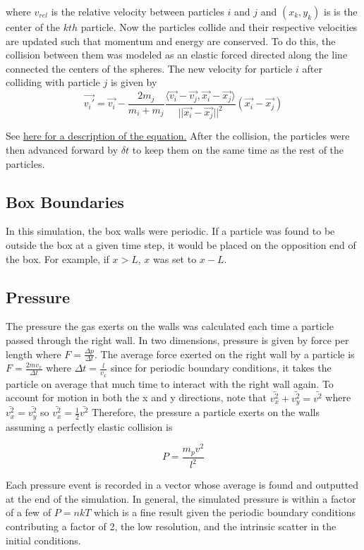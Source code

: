 \documentclass[12pt]{amsart}
\begin{document}
where $v_{rel}$ is the relative velocity between particles $i$ and $j$ and $(x_k,y_k)$ is is the center of the $kth$ particle.  Now the particles collide and their respective velocities are updated such that momentum and energy are conserved.  To do this, the collision between them was modeled as an elastic forced directed along the line connected the centers of the spheres.  The new velocity for particle $i$ after colliding with particle $j$ is given by
$$ \vec{v_i'} = \vec{v_i} - \frac{2 m_j}{m_i + m_j} \frac{\langle \vec{v_i} - \vec{v_j}, \vec{x_i} - \vec{x_j}{ \rangle}}{||\vec{x_i} - \vec{x_j}||^2} (\vec{x_i} - \vec{x_j}) $$
  
 See \href{https://en.wikipedia.org/wiki/Elastic_collision#Two-dimensional_collision_with_two_moving_objects}{here for a description of the equation.}   After the collision, the particles were then advanced forward by $\delta t$ to keep them on the same time as the rest of the particles.
 
\subsection{Box Boundaries}

In this simulation, the box walls were periodic.  If a particle was found to be outside the box at a given time step, it would be placed on the opposition end of the box.  For example, if $x > L$, $x$ was set to $x - L$.  

\subsection{Pressure}

The pressure the gas exerts on the walls was calculated each time a particle passed through the right wall.  In two dimensions, pressure is given by force per length where $F = \frac{\Delta p}{\Delta t}$.  The average force exerted on the right wall by a particle is $F = \frac{2 m v_x}{\Delta t}$ where $\Delta t = \frac{l}{v_x}$ since for periodic boundary conditions, it takes the particle on average that much time to interact with the right wall again.  To account for motion in both the x and y directions, note that $\bar{v_x^2} + \bar{v_y^2} = \bar{v^2}$ where $\bar{v_x^2} = \bar{v_y^2}$ so $\bar{v_x^2} = \frac{1}{2} \bar{v^2}$ Therefore, the pressure a particle exerts on the walls assuming a perfectly elastic collision is

$$ P =  \frac{m_p v^2}{l^2}   $$

Each pressure event is recorded in a vector whose average is found and outputted at the end of the simulation.  In general, the simulated pressure is within a factor of a few of $P = nkT$ which is a fine result given the periodic boundary conditions contributing a factor of 2, the low resolution, and the intrinsic scatter in the initial conditions.
\end{document}
